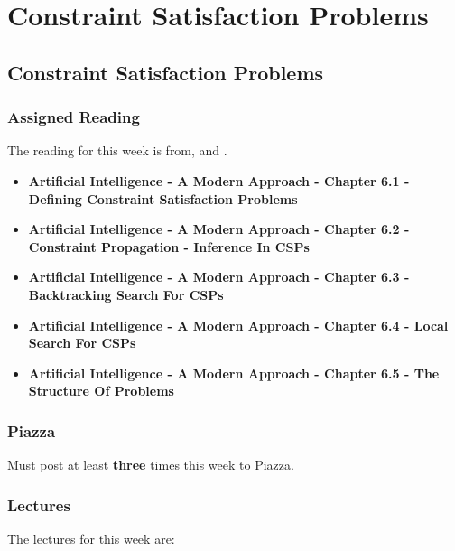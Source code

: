 \clearpage

\renewcommand{\ChapTitle}{Constraint Satisfaction Problems}
\renewcommand{\SectionTitle}{Constraint Satisfaction Problems}

\chapter{\ChapTitle}

\section{\SectionTitle}

\subsection{Assigned Reading}

The reading for this week is from, \AITextbook \hspace*{1pt} and \RLTextbook.

\begin{itemize}
    \item \textbf{Artificial Intelligence - A Modern Approach - Chapter 6.1 - Defining Constraint Satisfaction Problems}
    \item \textbf{Artificial Intelligence - A Modern Approach - Chapter 6.2 - Constraint Propagation - Inference In CSPs}
    \item \textbf{Artificial Intelligence - A Modern Approach - Chapter 6.3 - Backtracking Search For CSPs}
    \item \textbf{Artificial Intelligence - A Modern Approach - Chapter 6.4 - Local Search For CSPs}
    \item \textbf{Artificial Intelligence - A Modern Approach - Chapter 6.5 - The Structure Of Problems}
\end{itemize}

\subsection{Piazza}

Must post at least \textbf{three} times this week to Piazza.

\subsection{Lectures}

The lectures for this week are:

